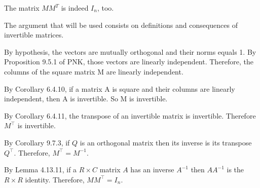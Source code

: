 \documentclass[11pt,reqno,a4paper]{amsart}
\begin{document}
The matrix $M M^T$ is indeed $I_n$, too.

The argument that will be used consists on definitions and consequences of invertible matrices.

By hypothesis, the vectors are mutually orthogonal and their norms equals 1.
By Proposition 9.5.1 of PNK, those vectors are linearly independent.
Therefore, the columns of the square matrix M are linearly independent.

By Corollary 6.4.10, if a matrix A is square and their columns are linearly independent, then A is invertible.
So M is invertible.

By Corollary 6.4.11, the transpose of an invertible matrix is invertible. Therefore $M^\intercal$ is invertible.

By Corollary 9.7.3, if $Q$ is an orthogonal matrix then its inverse is its transpose $Q^\intercal$.
Therefore, $M^{\intercal} = M^{-1}$.


By Lemma 4.13.11, if a $R \times C$ matrix $A$ has an inverse $A^{-1}$ then $A A^{-1}$ is the $R \times R$ identity.
Therefore, $M M^\intercal = I_n$. 





\endgroup
\end{document}
